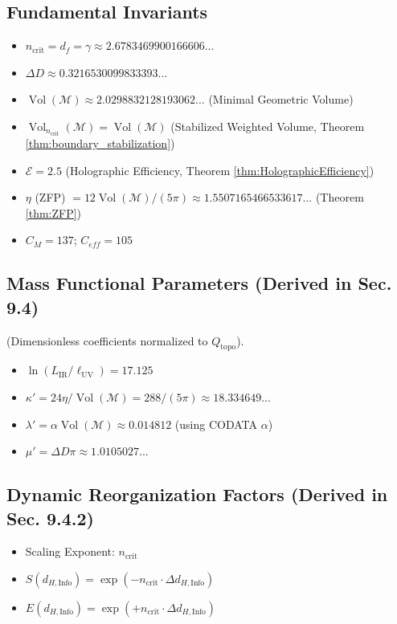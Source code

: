 \documentclass[11pt, a4paper]{article}
\theoremstyle{definition}
\theoremstyle{definition}
\newcommand{\M}{\mathcal{M}}
\newcommand{\Qtopo}{Q_{\text{topo}}}
\newcommand{\Vol}{\operatorname{Vol}}
\newcommand{\LIR}{L_{\mathrm{IR}}}
\newcommand{\lUV}{\ell_{\mathrm{UV}}}
\newcommand{\Veight}{\Vol(\M)}
\newcommand{\df}{d_f} %
\newcommand{\VolNcrit}{\Vol_{\ncrit}}
\newcommand{\dHInfo}{d_{H,\mathrm{Info}}} %
\newcommand{\ncrit}{n_{\mathrm{crit}}}
\newcommand{\Ecal}{\mathcal{E}} %
\newcommand{\ncritval}{2.6783469900166606...}
\newcommand{\DeltaDval}{0.3216530099833393...}
\newcommand{\Vval}{2.0298832128193062...}
\newcommand{\etaval}{1.5507165466533617...}
\begin{document}
\subsection{Fundamental Invariants}
\begin{itemize}
    \item $\ncrit = \df = \gamma \approx \ncritval$
    \item $\Delta D \approx \DeltaDval$
    \item $\Veight \approx \Vval$ (Minimal Geometric Volume)
    \item $\VolNcrit(\M) = \Veight$ (Stabilized Weighted Volume, Theorem \ref{thm:boundary_stabilization})
    \item $\Ecal = 2.5$ (Holographic Efficiency, Theorem \ref{thm:HolographicEfficiency})
    \item $\eta$ (ZFP) $= 12\Veight/(5\pi) \approx \etaval$ (Theorem \ref{thm:ZFP})
    \item $C_M = 137$; $C_{eff} = 105$
\end{itemize}

\subsection{Mass Functional Parameters (Derived in Sec. 9.4)}
(Dimensionless coefficients normalized to $\Qtopo$).
\begin{itemize}
    \item $\ln(\LIR/\lUV) = 17.125$
    \item $\kappa' = 24\eta/\Veight = 288/(5\pi) \approx 18.334649...$
    \item $\lambda' = \alpha \Veight \approx 0.014812$ (using CODATA $\alpha$)
    \item $\mu' = \Delta D \pi \approx 1.0105027...$
\end{itemize}

\subsection{Dynamic Reorganization Factors (Derived in Sec. 9.4.2)}
\begin{itemize}
    \item Scaling Exponent: $\ncrit$
    \item $S(\dHInfo) = \exp(-\ncrit \cdot \Delta \dHInfo)$
    \item $E(\dHInfo) = \exp(+\ncrit \cdot \Delta \dHInfo)$
\end{itemize}
\end{document}
